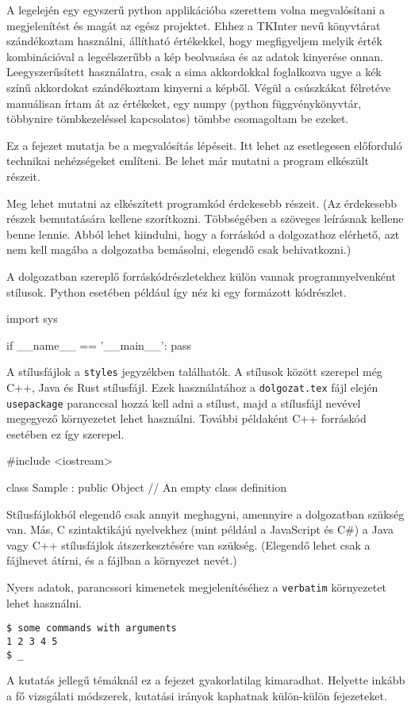 
A legelején egy egyszerű python applikációba szerettem volna megvalósítani a megjelenítést és magát az egész projektet. Ehhez a TKInter nevű könyvtárat szándékoztam használni, állítható értékekkel, hogy megfigyeljem melyik érték kombinációval a legcélszerűbb a kép beolvasása és az adatok kinyerése onnan. Leegyszerűsített használatra, csak a sima akkordokkal foglalkozva ugye a kék színű akkordokat szándékoztam kinyerni a képből. Végül a csúszkákat félretéve manuálisan írtam át az értékeket, egy numpy (python függvénykönyvtár, többynire tömbkezeléssel kapcsolatos) tömbbe csomagoltam be ezeket.

Ez a fejezet mutatja be a megvalósítás lépéseit.
Itt lehet az esetlegesen előforduló technikai nehézségeket említeni.
Be lehet már mutatni a program elkészült részeit.

Meg lehet mutatni az elkészített programkód érdekesebb részeit.
(Az érdekesebb részek bemutatására kellene szorítkozni.
Többségében a szöveges leírásnak kellene benne lennie.
Abból lehet kiindulni, hogy a forráskód a dolgozathoz elérhető, azt nem kell magába a dolgozatba bemásolni, elegendő csak behivatkozni.)

A dolgozatban szereplő forráskódrészletekhez külön vannak programnyelvenként stílusok.
Python esetében például így néz ki egy formázott kódrészlet.
\begin{python}
import sys

if __name__ == '__main__':
    pass
\end{python}

A stílusfájlok a \texttt{styles} jegyzékben találhatók.
A stílusok között szerepel még C++, Java és Rust stílusfájl.
Ezek használatához a \texttt{dolgozat.tex} fájl elején \texttt{usepackage} paranccsal hozzá kell adni a stílust, majd a stílusfájl nevével megegyező környezetet lehet használni.
További példaként C++ forráskód esetében ez így szerepel.
\begin{cpp}
#include <iostream>

class Sample : public Object
{
    // An empty class definition
}
\end{cpp}
Stílusfájlokból elegendő csak annyit meghagyni, amennyire a dolgozatban szükség van.
Más, C szintaktikájú nyelvekhez (mint például a JavaScript és C\#) a Java vagy C++ stílusfájlok átszerkesztésére van szükség.
(Elegendő lehet csak a fájlnevet átírni, és a fájlban a környezet nevét.)

Nyers adatok, parancssori kimenetek megjelenítéséhez a \texttt{verbatim} környezetet lehet használni.
\begin{verbatim}
$ some commands with arguments
1 2 3 4 5
$ _
\end{verbatim}

A kutatás jellegű témáknál ez a fejezet gyakorlatilag kimaradhat.
Helyette inkább a fő vizsgálati módszerek, kutatási irányok kaphatnak külön-külön fejezeteket.
